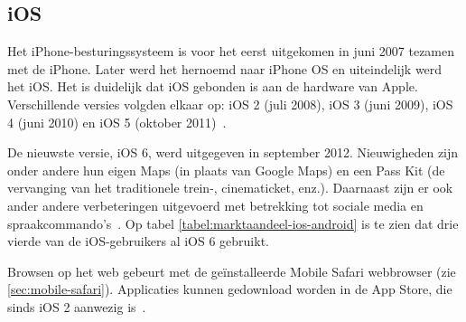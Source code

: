 \begin{table}[t]
\centering
{}
\quad
{}
\caption{Marktaandeel van iOS-versies op 14 februari 2013 en Android-versies op 2 april 2013.  \protect\cite{Sylvain2013,Android2013}.}
\label{tabel:marktaandeel-ios-android}
\end{table}

\subsection{iOS}
Het iPhone-besturingssysteem is voor het eerst uitgekomen in juni 2007 tezamen met de iPhone. 
Later werd het hernoemd naar iPhone OS en uiteindelijk werd het iOS. 
Het is duidelijk dat iOS gebonden is aan de hardware van Apple. 
Verschillende versies volgden elkaar op: iOS 2 (juli 2008), iOS 3 (juni 2009), iOS 4 (juni 2010) en iOS 5 (oktober 2011)~\cite{Deitel2012, PhilDutson2012}. 

De nieuwste versie, iOS 6, werd uitgegeven in september 2012. 
Nieuwigheden zijn onder andere hun eigen Maps (in plaats van Google Maps) en een Pass Kit (de vervanging van het traditionele trein-, cinematicket, enz.). 
Daarnaast zijn er ook ander andere verbeteringen uitgevoerd met betrekking tot sociale media en spraakcommando's~\cite{Deitel2012}. 
Op tabel \ref{tabel:marktaandeel-ios-android} is te zien dat drie vierde van de iOS-gebruikers al iOS 6 gebruikt.

Browsen op het web gebeurt met de geïnstalleerde Mobile Safari webbrowser (zie \ref{sec:mobile-safari}). Applicaties kunnen gedownload worden in de App Store, die sinds iOS 2 aanwezig is~\cite{Deitel2012}. 

